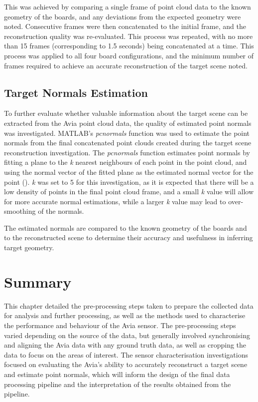 This was achieved by comparing a single frame of point cloud data to the known geometry of the boards, and any deviations from the expected geometry were noted. Consecutive frames were then concatenated to the initial frame, and the reconstruction quality was re-evaluated. This process was repeated, with no more than 15 frames (corresponding to 1.5 seconds) being concatenated at a time. This process was applied to all four board configurations, and the minimum number of frames required to achieve an accurate reconstruction of the target scene noted.

\subsection{Target Normals Estimation}
\label{subsec:ch5.section2.subsec2}

To further evaluate whether valuable information about the target scene can be extracted from the Avia point cloud data, the quality of estimated point normals was investigated. MATLAB's \emph{pcnormals} function was used to estimate the point normals from the final concatenated point clouds created during the target scene reconstruction investigation. The \emph{pcnormals} function estimates point normals by fitting a plane to the \emph{k} nearest neighbours of each point in the point cloud, and using the normal vector of the fitted plane as the estimated normal vector for the point (\cite{PcnormalsEstimateNormals}). \emph{k} was set to 5 for this investigation, as it is expected that there will be a low density of points in the final point cloud frame, and a small \emph{k} value will allow for more accurate normal estimations, while a larger \emph{k} value may lead to over-smoothing of the normals.

The estimated normals are compared to the known geometry of the boards and to the reconstructed scene to determine their accuracy and usefulness in inferring target geometry.

\section{Summary}
\label{sec:ch5.section3}

This chapter detailed the pre-processing steps taken to prepare the collected data for analysis and further processing, as well as the methods used to characterise the performance and behaviour of the Avia sensor. The pre-processing steps varied depending on the source of the data, but generally involved synchronising and aligning the Avia data with any ground truth data, as well as cropping the data to focus on the areas of interest. The sensor characterisation investigations focused on evaluating the Avia's ability to accurately reconstruct a target scene and estimate point normals, which will inform the design of the final data processing pipeline and the interpretation of the results obtained from the pipeline.

